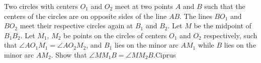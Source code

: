 Two circles with centers $O_{1}$ and $O_{2}$ meet at two points $A$ and $B$ such that the centers of the circles are on opposite sides of the line $AB$. The lines $BO_{1}$ and $BO_{2}$ meet their respective circles again at $B_{1}$ and $B_{2}$. Let $M$ be the midpoint of $B_{1}B_{2}$. Let $M_{1}$, $M_{2}$ be points on the circles of centers $O_{1}$ and $O_{2}$ respectively, such that  $\angle AO_{1}M_{1}= \angle AO_{2}M_{2}$, and $B_{1}$ lies on the minor arc $AM_{1}$ while $B$ lies on the minor arc $AM_{2}$. Show that $\angle MM_{1}B = \angle MM_{2}B$.Ciprus